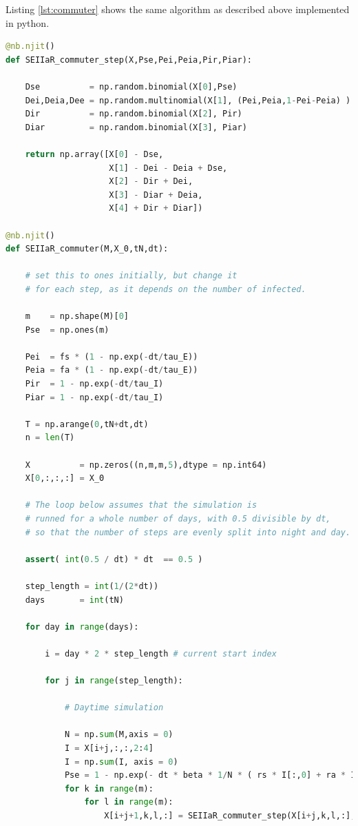 Listing \ref{lst:commuter} shows the same algorithm as described above implemented in python.

\begin{lstlisting}[language=Python,label={lst:commuter},caption={SEIIaR commuter algorithm implemented in python}]
@nb.njit()
def SEIIaR_commuter_step(X,Pse,Pei,Peia,Pir,Piar):

    Dse          = np.random.binomial(X[0],Pse)
    Dei,Deia,Dee = np.random.multinomial(X[1], (Pei,Peia,1-Pei-Peia) )
    Dir          = np.random.binomial(X[2], Pir)
    Diar         = np.random.binomial(X[3], Piar)

    return np.array([X[0] - Dse,
                     X[1] - Dei - Deia + Dse,
                     X[2] - Dir + Dei,
                     X[3] - Diar + Deia,
                     X[4] + Dir + Diar])

@nb.njit()
def SEIIaR_commuter(M,X_0,tN,dt):
    
    # set this to ones initially, but change it 
    # for each step, as it depends on the number of infected.

    m    = np.shape(M)[0] 
    Pse  = np.ones(m)

    Pei  = fs * (1 - np.exp(-dt/tau_E))
    Peia = fa * (1 - np.exp(-dt/tau_E))
    Pir  = 1 - np.exp(-dt/tau_I)
    Piar = 1 - np.exp(-dt/tau_I)

    T = np.arange(0,tN+dt,dt)
    n = len(T)

    X          = np.zeros((n,m,m,5),dtype = np.int64)
    X[0,:,:,:] = X_0

    # The loop below assumes that the simulation is
    # runned for a whole number of days, with 0.5 divisible by dt,
    # so that the number of steps are evenly split into night and day.
    
    assert( int(0.5 / dt) * dt  == 0.5 )

    step_length = int(1/(2*dt))
    days       = int(tN)
    
    for day in range(days):

        i = day * 2 * step_length # current start index
        
        for j in range(step_length):

            # Daytime simulation
            
            N = np.sum(M,axis = 0)
            I = X[i+j,:,:,2:4]
            I = np.sum(I, axis = 0)
            Pse = 1 - np.exp(- dt * beta * 1/N * ( rs * I[:,0] + ra * I[:,1] ))
            for k in range(m):
                for l in range(m):
                    X[i+j+1,k,l,:] = SEIIaR_commuter_step(X[i+j,k,l,:],Pse[k],Pei,Peia,Pir,Piar)


\end{lstlisting}
